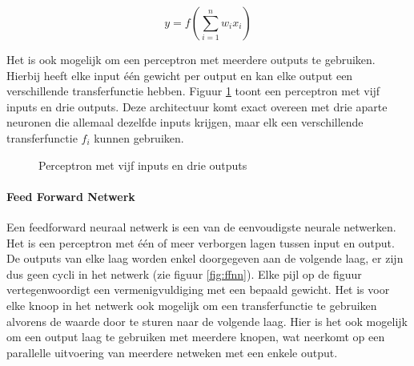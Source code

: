 \begin{equation}
    y = f(\sum\limits_{i=1}^{n}w_i x_i)
    \label{formule:neuron}
\end{equation}

Het is ook mogelijk om een perceptron met meerdere outputs te gebruiken. Hierbij heeft elke input \'e\'en gewicht per output en kan elke output een verschillende transferfunctie hebben. Figuur \ref{fig:perceptron} toont een perceptron met vijf inputs en drie outputs. Deze architectuur komt exact overeen met drie aparte neuronen die allemaal dezelfde inputs krijgen, maar elk een verschillende transferfunctie $f_i$ kunnen gebruiken.

\begin{figure}[ht]
\def\layersep{2.5cm}
\centering
{}
\caption{Perceptron met vijf inputs en drie outputs}
\label{fig:perceptron}
\end{figure}


\paragraph{Feed Forward Netwerk}
\label{par:concept}
Een feedforward neuraal netwerk is een van de eenvoudigste neurale netwerken. Het is een perceptron met \'e\'en of meer verborgen lagen tussen input en output. De outputs van elke laag worden enkel doorgegeven aan de volgende laag, er zijn dus geen cycli in het netwerk (zie figuur \ref{fig:ffnn}). Elke pijl op de figuur vertegenwoordigt een vermenigvuldiging met een bepaald gewicht. Het is voor elke knoop in het netwerk ook mogelijk om een transferfunctie te gebruiken alvorens de waarde door te sturen naar de volgende laag. Hier is het ook mogelijk om een output laag te gebruiken met meerdere knopen, wat neerkomt op een parallelle uitvoering van meerdere netweken met een enkele output. \cite{Bishop:1995:NNP:525960}

